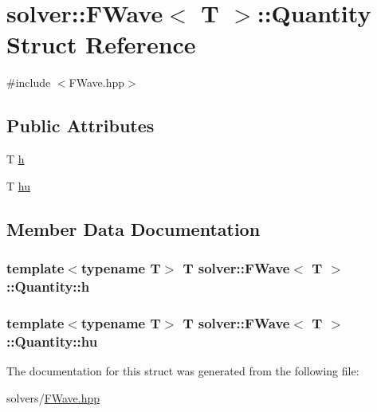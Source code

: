 \hypertarget{structsolver_1_1FWave_1_1Quantity}{}\section{solver\+:\+:F\+Wave$<$ T $>$\+:\+:Quantity Struct Reference}
\label{structsolver_1_1FWave_1_1Quantity}


{\ttfamily \#include $<$F\+Wave.\+hpp$>$}

\subsection*{Public Attributes}
\begin{DoxyCompactItemize}
\item 
T \hyperlink{structsolver_1_1FWave_1_1Quantity_ab21e966b42ed55a04b852deb96ec7285}{h}
\item 
T \hyperlink{structsolver_1_1FWave_1_1Quantity_a85b3d7be51ca5dc26a031d421c16095c}{hu}
\end{DoxyCompactItemize}


\subsection{Member Data Documentation}
\hypertarget{structsolver_1_1FWave_1_1Quantity_ab21e966b42ed55a04b852deb96ec7285}{}
\subsubsection[{h}]{\setlength{\rightskip}{0pt plus 5cm}template$<$typename T$>$ T {\bf solver\+::\+F\+Wave}$<$ T $>$\+::Quantity\+::h}\label{structsolver_1_1FWave_1_1Quantity_ab21e966b42ed55a04b852deb96ec7285}
\hypertarget{structsolver_1_1FWave_1_1Quantity_a85b3d7be51ca5dc26a031d421c16095c}{}
\subsubsection[{hu}]{\setlength{\rightskip}{0pt plus 5cm}template$<$typename T$>$ T {\bf solver\+::\+F\+Wave}$<$ T $>$\+::Quantity\+::hu}\label{structsolver_1_1FWave_1_1Quantity_a85b3d7be51ca5dc26a031d421c16095c}


The documentation for this struct was generated from the following file\+:\begin{DoxyCompactItemize}
\item 
solvers/\hyperlink{FWave_8hpp}{F\+Wave.\+hpp}\end{DoxyCompactItemize}
